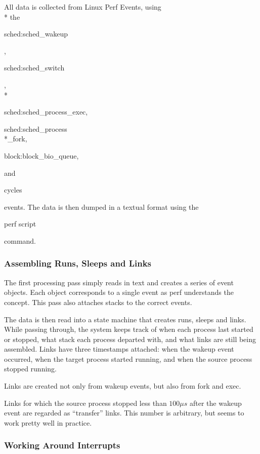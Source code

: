 \documentclass{article}
\begin{document}
All data is collected from Linux Perf Events, using \\* the \begin{tt}sched:sched\_wakeup\end{tt}, \begin{tt}sched:sched\_switch\end{tt}, \\* \begin{tt}sched:sched\_process\_exec,\end{tt} \begin{tt}sched:sched\_process\\*\_fork,\end{tt} \begin{tt}block:block\_bio\_queue,\end{tt} and \begin{tt}cycles\end{tt} events.  The data is then dumped in a textual format using the \begin{tt}perf script\end{tt} command.


\subsubsection{Assembling Runs, Sleeps and Links}

The first processing pass simply reads in text and creates a series of event objects.  Each object corresponds to a single event as perf understands the concept.  This pass also attaches stacks to the correct events.

The data is then read into a  state machine that creates runs, sleeps and links.  While passing through, the system keeps track of when each process last started or stopped, what stack each process departed with, and what links are still being assembled.  Links have three timestamps attached: when the wakeup event occurred, when the target process started running, and when the source process stopped running.

Links are created not only from wakeup events, but also from fork and exec.

Links for which the source process stopped less than $100\mu s$ after the wakeup event are regarded as ``transfer'' links.  This number is arbitrary, but seems to work pretty well in practice.

\subsubsection{Working Around Interrupts}
\end{document}
